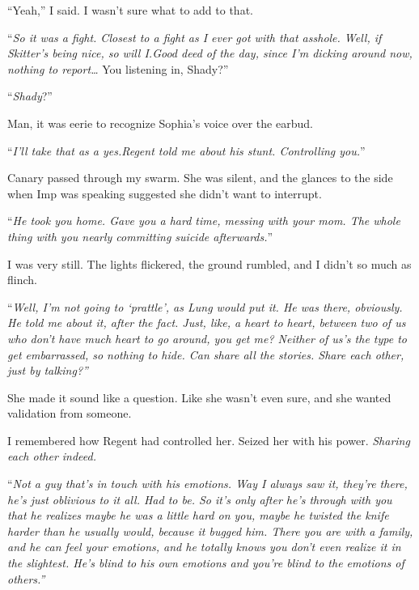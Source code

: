 ``Yeah,'' I said.  I wasn't sure what to add to that.



``\emph{So it was a fight.  Closest to a fight as I ever got with that asshole.  Well, if Skitter's being nice, so will I.}\emph{Good deed of the day, since I'm dicking around now, nothing to report\ldots}  You listening in, Shady?''



``\emph{Shady}?''



Man, it was eerie to recognize Sophia's voice over the earbud.



``\emph{I'll take that as a yes.}\emph{Regent told me about his stunt.  Controlling you.}''



Canary passed through my swarm.  She was silent, and the glances to the side when Imp was speaking suggested she didn't want to interrupt.



``\emph{He took you home.  Gave you a hard time, messing with your mom.  The whole thing with you nearly committing suicide afterwards.}''



I was very still.  The lights flickered, the ground rumbled, and I didn't so much as flinch.



``\emph{Well, I'm not going to `prattle', as Lung would put it.  He was there, obviously.  He told me about it, after the fact.  Just, like, a heart to heart, between two of us who don't have much heart to go around, you get me?  Neither of us's the type to get embarrassed, so nothing to hide.  Can share all the stories.  Share each other, just by talking?''}



She made it sound like a question.  Like she wasn't even sure, and she wanted validation from someone.



I remembered how Regent had controlled her.  Seized her with his power.  \emph{Sharing each other indeed.}



``\emph{Not a guy that's in touch with his emotions.  Way I always saw it, they're there, he's just oblivious to it all.  Had to be.  So it's only after he's through with you that he realizes maybe he was a little hard on you, maybe he twisted the knife harder than he usually would, because it bugged him.  There you are with a family, and he can feel your emotions, and he totally knows you don't even realize it in the slightest.  He's blind to his own emotions and you're blind to the emotions of others.''}



